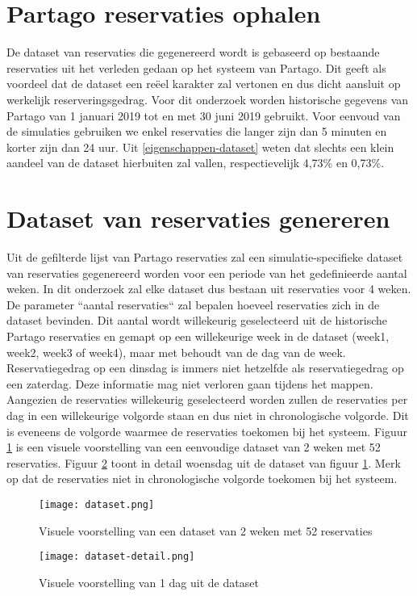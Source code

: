 \section{Partago reservaties ophalen} \label{partago-reservaties-ophalen}
De dataset van reservaties die gegenereerd wordt is gebaseerd op bestaande reservaties uit het verleden gedaan op het systeem van Partago. Dit geeft als voordeel dat de dataset een reëel karakter zal vertonen en dus dicht aansluit op werkelijk reserveringsgedrag. Voor dit onderzoek worden historische gegevens van Partago van 1 januari 2019 tot en met 30 juni 2019 gebruikt. Voor eenvoud van de simulaties gebruiken we enkel reservaties die langer zijn dan 5 minuten en korter zijn dan 24 uur. Uit \ref{eigenschappen-dataset} weten dat slechts een klein aandeel van de dataset hierbuiten zal vallen, respectievelijk 4,73\% en 0,73\%.

\section{Dataset van reservaties genereren} \label{dataset-genereren}
Uit de gefilterde lijst van Partago reservaties zal een simulatie-specifieke dataset van reservaties gegenereerd worden voor een periode van het gedefinieerde aantal weken. In dit onderzoek zal elke dataset dus bestaan uit reservaties voor 4 weken. De parameter ``aantal reservaties`` zal bepalen hoeveel reservaties zich in de dataset bevinden. Dit aantal wordt willekeurig geselecteerd uit de historische Partago reservaties en gemapt op een willekeurige week in de dataset (week1, week2, week3 of week4), maar met behoudt van de dag van de week. Reservatiegedrag op een dinsdag is immers niet hetzelfde als reservatiegedrag op een zaterdag. Deze informatie mag  niet verloren gaan tijdens het mappen. Aangezien de reservaties willekeurig geselecteerd worden zullen de reservaties per dag in een willekeurige volgorde staan en dus niet in chronologische volgorde. Dit is eveneens de volgorde waarmee de reservaties toekomen bij het systeem. Figuur \ref{fig:visuele-voorstelling-dataset} is een visuele voorstelling van een eenvoudige dataset van 2 weken met 52 reservaties. Figuur \ref{fig:visuele-voorstelling-dag-dataset} toont in detail woensdag uit de dataset van figuur \ref{fig:visuele-voorstelling-dataset}. Merk op dat de reservaties niet in chronologische volgorde toekomen bij het systeem.
\begin{figure}[h]
	\texttt{[image: dataset.png]}
	\caption[Visuele voorstelling van een dataset]{Visuele voorstelling van een dataset van 2 weken met 52 reservaties}
	\label{fig:visuele-voorstelling-dataset}
\end{figure}
\begin{figure}[h]
	\texttt{[image: dataset-detail.png]}
	\caption[Visuele voorstelling van 1 dag in de dataset]{Visuele voorstelling van 1 dag uit de dataset}
	\label{fig:visuele-voorstelling-dag-dataset}
\end{figure}
